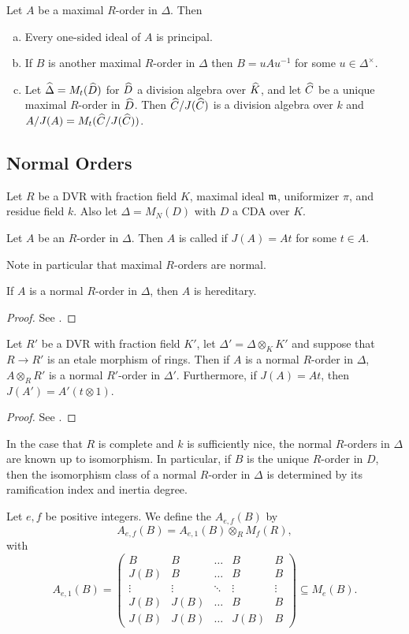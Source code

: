 \begin{thm}
Let $A$ be a maximal $R$-order in $\Delta$.  Then
\begin{enumerate}[(a)]
\item  Every one-sided ideal of $A$ is principal.
\item  If $B$ is another maximal $R$-order in $\Delta$ then $B = uAu^{-1}$ for some $u\in \Delta^\times$.
\item  Let $\widehat\Delta = M_t(\widehat D)$ for $\widehat D$ a division algebra over $\widehat K$, and let $\widehat C$ be a unique maximal $R$-order in $\widehat D$.  Then $\widehat C/J(\widehat C)$ is a division algebra over $k$ and $A/J(A) = M_t(\widehat C/J(\widehat C))$.
\end{enumerate}
\end{thm}

\subsection{Normal Orders}
Let $R$ be a DVR with fraction field $K$, maximal ideal $\mathfrak{m}$, uniformizer $\pi$, and residue field $k$.  Also let $\Delta = M_N(D)$ with $D$ a CDA over $K$.
\begin{defn}
Let $A$ be an $R$-order in $\Delta$.  Then $A$ is called  if $J(A) = At$ for some $t\in A$.
\end{defn}
Note in particular that maximal $R$-orders are normal.
\begin{lem}
If $A$ is a normal $R$-order in $\Delta$, then $A$ is hereditary.
\end{lem}
\begin{proof}
See \cite{Artin&deJong}.
\end{proof}
\begin{lem}
Let $R'$ be a DVR with fraction field $K'$, let $\Delta' = \Delta\otimes_KK'$ and suppose that $R\rightarrow R'$ is an etale morphism of rings.  Then if $A$ is a normal $R$-order in $\Delta$, $A\otimes_R R'$ is a normal $R'$-order in $\Delta'$.  Furthermore, if $J(A) = At$, then $J(A') = A'(t\otimes 1)$.
\end{lem}
\begin{proof}
See \cite{Artin&deJong}.
\end{proof}
In the case that $R$ is complete and $k$ is sufficiently nice, the normal $R$-orders in $\Delta$ are known up to isomorphism.  In particular, if $B$ is the unique $R$-order in $D$, then the isomorphism class of a normal $R$-order in $\Delta$ is determined by its ramification index and inertia degree.
\begin{defn}
Let $e,f$ be positive integers.  We define the  $A_{e,f}(B)$ by
$$A_{e,f}(B)= A_{e,1}(B)\otimes_R M_f(R),$$ with
$$A_{e,1}(B)= \left(\begin{array}{ccccc}
B      &  B     & \dots  & B      & B\\
J(B)   &  B     & \dots  & B      & B\\
\vdots & \vdots & \ddots & \vdots & \vdots\\
J(B)   & J(B)   & \dots  & B      & B\\
J(B)   & J(B)   & \dots  & J(B)   & B
\end{array}\right)\subseteq M_e(B).$$
\end{defn}

